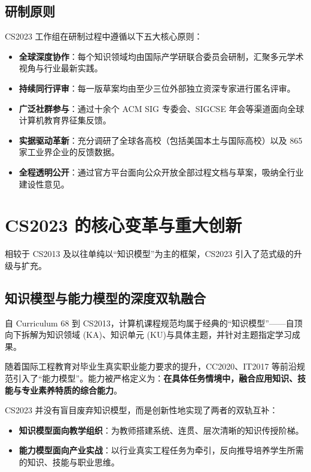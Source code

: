 \subsection{研制原则}
CS2023 工作组在研制过程中遵循以下五大核心原则：
\begin{itemize}
    \item \textbf{全球深度协作}：每个知识领域均由国际产学研联合委员会研制，汇聚多元学术视角与行业最新实践。
    \item \textbf{持续同行评审}：每一版草案均由至少三位外部独立资深专家进行匿名评审。
    \item \textbf{广泛社群参与}：通过十余个 ACM SIG 专委会、SIGCSE 年会等渠道面向全球计算机教育界征集反馈。
    \item \textbf{实据驱动革新}：充分调研了全球各高校（包括美国本土与国际高校）以及 865 家工业界企业的反馈数据。
    \item \textbf{全程透明公开}：通过官方平台面向公众开放全部过程文档与草案，吸纳全行业建设性意见。
\end{itemize}

\section{CS2023 的核心变革与重大创新}

相较于 CS2013 及以往单纯以“知识模型”为主的框架，CS2023 引入了范式级的升级与扩充。

\subsection{知识模型与能力模型的深度双轨融合}
自 Curriculum 68 到 CS2013，计算机课程规范均属于经典的“知识模型”——自顶向下拆解为知识领域 (KA)、知识单元 (KU)与具体主题，并针对主题指定学习成果。

随着国际工程教育对毕业生真实职业能力要求的提升，CC2020、IT2017 等前沿规范引入了“能力模型”。能力被严格定义为：\textbf{在具体任务情境中，融合应用知识、技能与专业素养特质的综合能力}。

CS2023 并没有盲目废弃知识模型，而是创新性地实现了两者的双轨互补：
\begin{itemize}
    \item \textbf{知识模型面向教学组织}：为教师搭建系统、连贯、层次清晰的知识传授阶梯。
    \item \textbf{能力模型面向产业实战}：以行业真实工程任务为牵引，反向推导培养学生所需的知识、技能与职业思维。
\end{itemize}

